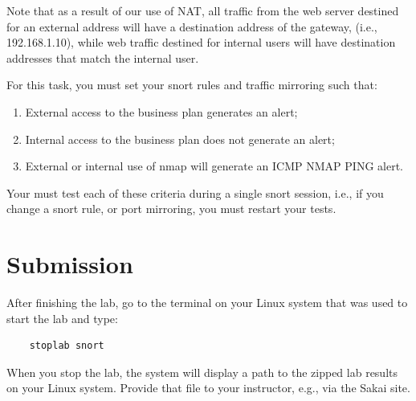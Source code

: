 Note that as a result of our use of NAT, all traffic from the web server destined for an
external address will have a destination address of the gateway, (i.e., 192.168.1.10), 
while web traffic destined for internal users will have destination addresses that match the internal user.

For this task, you must set your snort rules and traffic mirroring such that:
\begin{enumerate}
\item External access to the business plan generates an alert;
\item Internal access to the business plan does not generate an alert;
\item External or internal use of nmap will generate an ICMP NMAP PING alert.
\end{enumerate}
Your must test each of these criteria during a single snort session, i.e., if you change
a snort rule, or port mirroring, you must restart your tests.

\section{Submission}
After finishing the lab, go to the terminal on your Linux system that was used to start the lab and type:
\begin{verbatim}
    stoplab snort
\end{verbatim}
When you stop the lab, the system will display a path to the zipped lab results on your Linux system.  Provide that file to 
your instructor, e.g., via the Sakai site.


